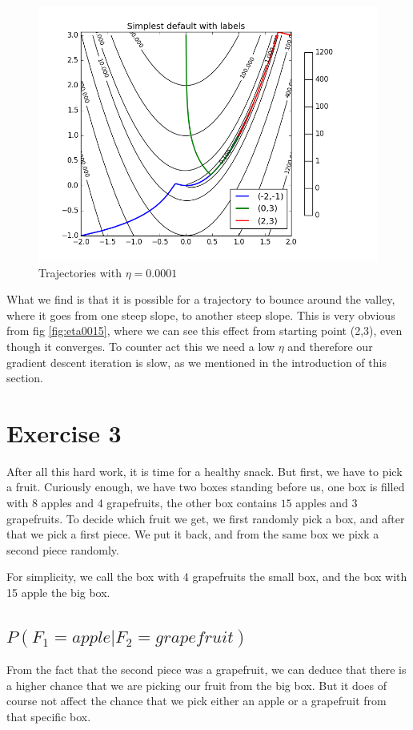 \documentclass[11pt]{article}
\begin{document}
\begin{figure}[H]
	\centering
	\includegraphics[trim={1cm 1cm 0.5cm 0.7cm},clip, scale=0.5]{images/exercise2_4_3.png}
	\caption{Trajectories with $\eta = 0.0001$}
	\label{fig:eta0001}
\end{figure}

What we find is that it is possible for a trajectory to bounce around the valley, where it goes from one steep slope, to another steep slope. This is very obvious from fig \ref{fig:eta0015}, where we can see this effect from starting point (2,3), even though it converges. To counter act this we need a low $\eta$ and therefore our gradient descent iteration is slow, as we mentioned in the introduction of this section.

\section{Exercise 3}

After all this hard work, it is time for a healthy snack. But first, we have to pick a fruit. Curiously enough, we have two boxes standing before us, one box is filled with $8$ apples and $4$ grapefruits, the other box contains $15$ apples and $3$ grapefruits. To decide which fruit we get, we first randomly pick a box, and after that we pick a first piece. We put it back, and from the same box we pixk a second piece randomly.

For simplicity, we call the box with 4 grapefruits the small box, and the box with 15 apple the big box.

\subsection{$P(F_1=apple|F_2=grapefruit)$}
From the fact that the second piece was a grapefruit, we can deduce that there is a higher chance that we are picking our fruit from the big box. But it does of course not affect the chance that we pick either an apple or a grapefruit from that specific box.
\end{document}
